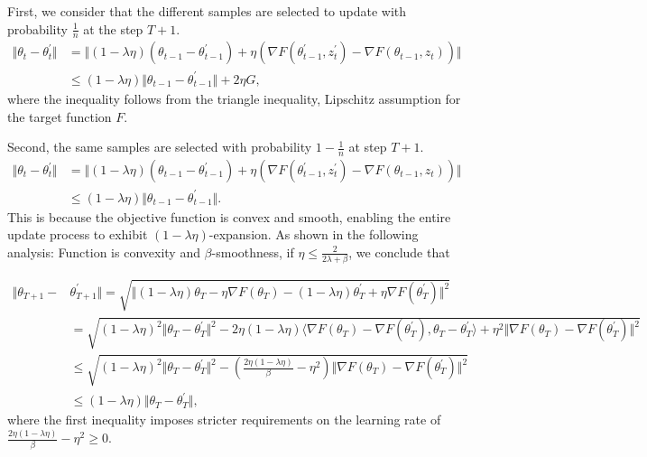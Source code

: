 First, we consider that the different samples are selected to update with probability $\frac{1}{n}$ at the step $T+1$.  
\begin{equation}
  \begin{aligned}
   \Vert \theta_t -\theta_t^{\prime} \Vert &= \Vert (1-\lambda \eta) (\theta_{t-1} - \theta_{t-1}^{\prime}) + \eta (\nabla F(\theta_{t-1}^{\prime},z_{t}^{\prime}) - \nabla F(\theta_{t-1},z_{t}))\Vert\\
    &\leq (1-\lambda \eta)\Vert\theta_{t-1} - \theta_{t-1}^{\prime}\Vert + 2 \eta G,
  \end{aligned}
 \end{equation}
where the inequality follows from the triangle inequality, Lipschitz assumption for the target function $F$.

Second, the same samples are selected with probability $1-\frac{1}{n}$ at step $T+1$. 
 \begin{equation}
  \begin{aligned}
   \Vert \theta_t -\theta_t^{\prime} \Vert &= \Vert (1-\lambda \eta) (\theta_{t-1} - \theta_{t-1}^{\prime}) + \eta (\nabla F(\theta_{t-1}^{\prime},z_{t}^{\prime}) - \nabla F(\theta_{t-1},z_{t}))\Vert\\
    &\leq (1-\lambda \eta)\Vert\theta_{t-1} - \theta_{t-1}^{\prime}\Vert.
  \end{aligned}
 \end{equation}
This is because the objective function is convex and smooth, enabling the entire update process to exhibit $(1-\lambda\eta)$-expansion. As shown in the following analysis: Function is convexity and $\beta$-smoothness, if $\eta \leq \frac{2}{2\lambda+\beta}$, we conclude that

\begin{equation}\label{eq:app2.3}
     \begin{aligned}
      \Vert \theta_{T+1} - &\theta_{T+1}^{\prime}\Vert = \sqrt{\Vert (1-\lambda\eta)\theta_{T} - \eta \nabla F(\theta_{T}) - (1-\lambda\eta)\theta_{T}^{\prime} + \eta \nabla F(\theta_{T}^{\prime})\Vert^2}  \\
      &=\sqrt{(1-\lambda\eta)^2\Vert \theta_{T} - \theta_{T}^{\prime} \Vert^2 - 2\eta (1-\lambda\eta)\langle \nabla F(\theta_{T}) -\nabla F(\theta_{T}^{\prime}), \theta_T- \theta_T^{\prime} \rangle +\eta^2 \Vert \nabla F(\theta_{T}) - \nabla F(\theta_{T}^{\prime})\Vert^2} \\
      &\leq \sqrt{(1-\lambda\eta)^2\Vert \theta_T- \theta_T^{\prime}\Vert^2 - \left(\frac{2\eta (1-\lambda\eta)}{\beta} -\eta^2 \right) \Vert \nabla F(\theta_{T}) -\nabla F(\theta_{T}^{\prime})\Vert^2} \\
      &\leq (1-\lambda\eta)\Vert \theta_T- \theta_T^{\prime}\Vert,
     \end{aligned}
\end{equation}
where the first inequality imposes stricter requirements on the learning rate of $\frac{2\eta (1-\lambda\eta)}{\beta} -\eta^2 \geq 0$.

